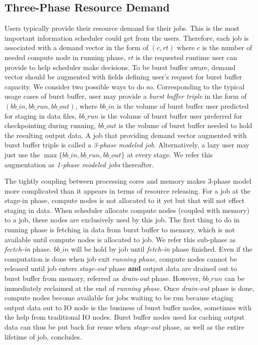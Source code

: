 \subsection{Three-Phase Resource Demand}
Users typically provide their resource demand for their jobs.
This is the most important information scheduler could get from the users.
Therefore, each job is associated with a demand vector in the form of $(c, rt)$
where $c$ is the number of needed compute node in running phase,
$rt$ is the requested runtime user can provide to help scheduler make decisions.
To be burst buffer aware, demand vector should be augmented
with fields defining user's request for burst buffer capacity.
We consider two possible ways to do so.
Corresponding to the typical usage cases of burst buffer,
user may provide a \textit{burst buffer triple} in the form of $(bb\_in, bb\_run, bb\_out)$,
where $bb\_in$ is the volume of burst buffer user predicted for staging in data files,
$bb\_run$ is the volume of burst buffer user preferred for checkpointing during running,
$bb\_out$ is the volume of burst buffer needed to hold the resulting output data.
A job that providing demand vector augmented with
burst buffer triple is called a \textit{3-phase modeled job}.
Alternatively, a lazy user may just use the $\max\{bb\_in, bb\_run, bb\_out\}$ at every stage.
We refer this augmentation as
\textit{1-phase modeled jobs} thereafter.

The tightly coupling between processing cores and memory makes 3-phase model
more complicated than it appears in terms of resource releasing.
For a job at the stage-in phase, compute nodes is not allocated to it yet
but that will not effect staging in data.
When scheduler allocate compute nodes (coupled with memory) to a job,
these nodes are exclusively used by this job.
The first thing to do in running phase is fetching in data from burst buffer to memory,
which is not available until compute nodes is allocated to job.
We refer this sub-phase as \textit{fectch-in} phase.
$bb\_in$ will be hold by job until \textit{fetch-in} phase finished.
Even if the computation is done when job exit \textit{running phase},
compute nodes cannot be released until job enters \textit{stage-out} phase 
\textbf{and} output data are drained out to burst buffer from memory,
referred as \textit{drain-out} phase.
However, $bb\_run$ can be immediately reclaimed at the end of \textit{running phase}.
Once \textit{drain-out} phase is done,
compute nodes become available for jobs waiting to be run
because staging output data out to IO node is the business of burst buffer nodes,
sometimes with the help from traditional IO nodes.
Burst buffer nodes used for caching output data can thus be put back for reuse
when \textit{stage-out} phase, as well as the entire lifetime of job, concludes.

